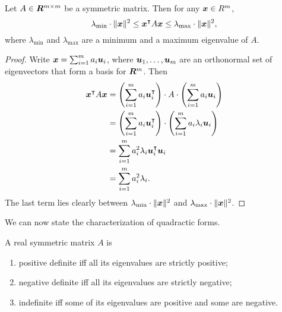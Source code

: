 \begin{lemma}
Let $A \in \bm{R}^{m \times m}$ be a symmetric matrix. Then for any $\boldsymbol{x} \in R^m$,
\[
    \lambda_{\text{min}} \cdot \lVert\boldsymbol{x}\rVert^2 \leq \boldsymbol{x}^{\intercal} A \boldsymbol{x} 
    \leq \lambda_{\text{max}} \cdot \lVert\boldsymbol{x}\rVert^2,
\]
where $ \lambda_{\text{min}} $ and $ \lambda_{\text{max}} $ are a minimum 
and a maximum eigenvalue of $A$. 
\end{lemma}
\begin{proof}
Write $\boldsymbol{x} = \sum_{i = 1}^m a_i \boldsymbol{u}_i$, where $\boldsymbol{u}_1, \ldots, \boldsymbol{u}_m$
are an orthonormal set of eigenvectors that form a basis for $\bm{R}^m$. Then
\begin{align*}
\boldsymbol{x}^{\intercal} A \boldsymbol{x} & =  \left ( \sum_{i = 1}^m a_i \boldsymbol{u}_i^{\intercal} \right ) 
                                 \cdot A \cdot 
                                 \left ( \sum_{i = 1}^m a_i \boldsymbol{u}_i \right ) \\
& =  \left ( \sum_{i = 1}^m a_i \boldsymbol{u}_i^{\intercal} \right ) \cdot 
     \left ( \sum_{i = 1}^m a_i \lambda_i \boldsymbol{u}_i \right ) \\
& = \sum_{i = 1}^{m} a_i^2 \lambda_i \boldsymbol{u}_i^{\intercal} \boldsymbol{u}_i \\
& =  \sum_{i = 1}^{m} a_i^2 \lambda_i. 
\end{align*}
The last term lies clearly between $ \lambda_{\text{min}} \cdot \lVert\boldsymbol{x}\rVert^2 $
and $\lambda_{\text{max}} \cdot \lVert\boldsymbol{x}\rVert^2$. 
\end{proof}

We can now state the characterization of quadractic forms.
\begin{theorem}
A real symmetric matrix $A$ is 
\begin{enumerate}
    \item positive definite iff all its eigenvalues are strictly positive;
    \item negative definite iff all its eigenvalues are strictly negative;
    \item indefinite iff some of its eigenvalues are positive and some are negative.
\end{enumerate}
\end{theorem}
